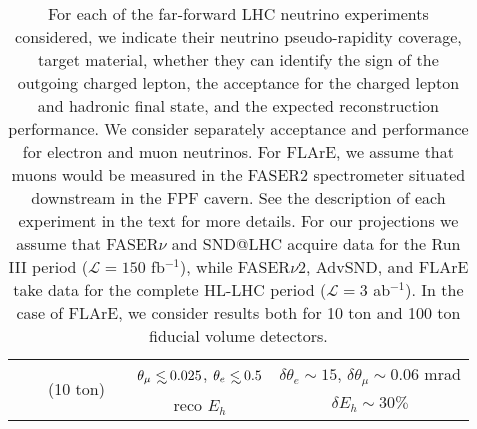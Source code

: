\begin{table}[t]
\begin{tabularx}{\textwidth}{Xccccc}
&   &  \multirow{2}{*}{(10 ton)}   &   & $\theta_\mu \lsim 0.025$, $\theta_e \lsim 0.5$ &    $\delta \theta_e \sim 15 $,
$\delta \theta_\mu \sim 0.06$ mrad\\
 &   &     &  & reco $E_h$  &    $\delta E_h \sim 30\% $   \\
  \bottomrule
\end{tabularx}
\vspace{0.2cm}
\caption{\small For each of the far-forward LHC neutrino experiments considered,
   we indicate their neutrino pseudo-rapidity coverage, target material, whether
  they can identify the sign of the outgoing charged lepton,
  the acceptance for the charged lepton and hadronic final state,
  and the expected reconstruction performance.
  We consider separately acceptance and performance for electron and muon
  neutrinos.
  For FLArE, we assume that muons would be measured in the FASER2 spectrometer
  situated downstream in the FPF cavern.
  See the description of each experiment in the text for more details.
  For our projections we assume that FASER$\nu$ and SND@LHC acquire data
  for the Run III period ($\mathcal{L}=150$ fb$^{-1}$), while FASER$\nu$2, AdvSND, and FLArE take data
  for the complete HL-LHC period ($\mathcal{L}=3$ ab$^{-1}$).
  In the case of FLArE, we consider results both
  for 10 ton and 100 ton fiducial volume detectors.
  \label{tab:FPF_experiments}
}
\end{table}
